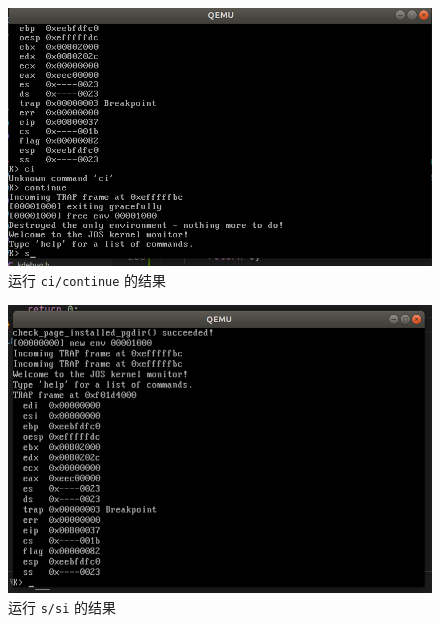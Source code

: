 \documentclass[11pt]{article}
\begin{document}
	
	\begin{figure}
		\centering
		\includegraphics[width=0.7\linewidth]{cicici.png}
		\caption{运行 \texttt{ci/continue} 的结果}
		\label{fig:kern}
	\end{figure}
		 
			\begin{figure}
				\centering
				\includegraphics[width=0.7\linewidth]{si.png}
				\caption{运行 \texttt{s/si} 的结果}
				\label{fig:kern}
			\end{figure}
			
		
		
	
\end{document}
